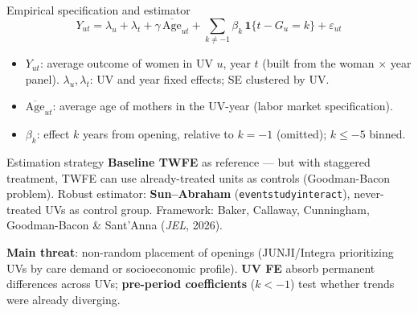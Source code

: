 \documentclass[aspectratio=169,10pt]{beamer}
\newcommand{\takeaway}[1]{\par\vspace{6pt}{\small\textcolor{steel}{$\Rightarrow$}\ \textbf{\textcolor{navy}{#1}}}}
\begin{document}
\begin{frame}{Empirical specification and estimator}
\[
Y_{ut} = \lambda_u + \lambda_t + \gamma\,\overline{\text{Age}}_{ut} + \sum_{k \neq -1} \beta_k \, \mathbf{1}\{t - G_u = k\} + \varepsilon_{ut}
\]

\vspace{2pt}
\begin{itemize}
  \footnotesize
  \item $Y_{ut}$: average outcome of women in UV $u$, year $t$ (built from the woman $\times$ year panel). $\lambda_u,\lambda_t$: UV and year fixed effects; SE clustered by UV.
  \item $\overline{\text{Age}}_{ut}$: average age of mothers in the UV-year (labor market specification).
  \item $\beta_k$: effect $k$ years from opening, relative to $k=-1$ (omitted); $k \le -5$ binned.
\end{itemize}

\vspace{4pt}
\begin{block}{Estimation strategy}
\footnotesize \textbf{Baseline TWFE} as reference --- but with staggered treatment, TWFE can use already-treated units as controls (Goodman-Bacon problem). Robust estimator: \textbf{Sun--Abraham} (\texttt{eventstudyinteract}), never-treated UVs as control group. Framework: Baker, Callaway, Cunningham, Goodman-Bacon \& Sant'Anna (\emph{JEL}, 2026).
\end{block}

\vspace{4pt}
\footnotesize \textbf{Main threat}: non-random placement of openings (JUNJI/Integra prioritizing UVs by care demand or socioeconomic profile). \textbf{UV FE} absorb permanent differences across UVs; \textbf{pre-period coefficients} ($k<-1$) test whether trends were already diverging.

\takeaway{Main estimator: Sun--Abraham with never-treated UVs as controls; TWFE as reference.}
\end{frame}
\end{document}
